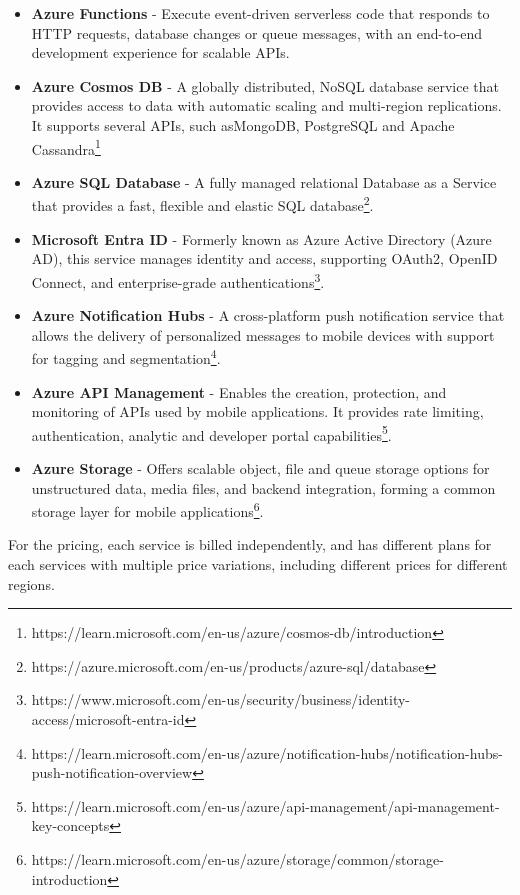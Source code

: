 \begin{itemize}
	\item \textbf{Azure Functions} - Execute event-driven serverless code that responds to HTTP requests, database changes or queue messages, with an end-to-end development experience for scalable APIs\cite{azureFunctions}.
	\item \textbf{Azure Cosmos DB} - A globally distributed, NoSQL database service that provides access to data with automatic scaling and multi-region replications. It supports several APIs, such asMongoDB, PostgreSQL and Apache Cassandra\footnote{https://learn.microsoft.com/en-us/azure/cosmos-db/introduction}
	\item \textbf{Azure SQL Database} - A fully managed relational Database as a Service that provides a fast, flexible and elastic SQL database\footnote{https://azure.microsoft.com/en-us/products/azure-sql/database}.
	\item \textbf{Microsoft Entra ID} - Formerly known as Azure Active Directory (Azure AD), this service manages identity and access, supporting OAuth2, OpenID Connect, and enterprise-grade authentications\footnote{https://www.microsoft.com/en-us/security/business/identity-access/microsoft-entra-id}.
	\item \textbf{Azure Notification Hubs} - A cross-platform push notification service that allows the delivery of personalized messages to mobile devices with support for tagging and segmentation\footnote{https://learn.microsoft.com/en-us/azure/notification-hubs/notification-hubs-push-notification-overview}.
	\item \textbf{Azure API Management} - Enables the creation, protection, and monitoring of APIs used by mobile applications. It provides rate limiting, authentication, analytic and developer portal capabilities\footnote{https://learn.microsoft.com/en-us/azure/api-management/api-management-key-concepts}.
	\item \textbf{Azure Storage} - Offers scalable object, file and queue storage options for unstructured data, media files, and backend integration, forming a common storage layer for mobile applications\footnote{https://learn.microsoft.com/en-us/azure/storage/common/storage-introduction}.
\end{itemize}

For the pricing, each service is billed independently, and has different plans for each services with multiple price variations, including different prices for different regions.

